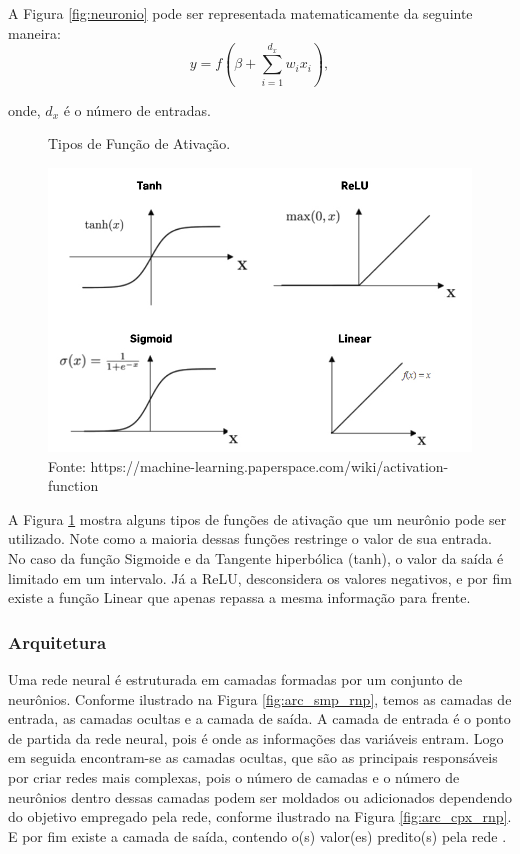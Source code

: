A Figura \ref{fig:neuronio} pode ser representada matematicamente da seguinte maneira:
\begin{equation}
    y = f (\beta + \sum_{i=1}^{d_x} w_ix_{i} ) ,
    \label{neuronio}
\end{equation}
 
\noindent onde, $d_x$ é o número de entradas.


\begin{figure}[H]
    \centering
    \caption{Tipos de Função de Ativação.}
    \includegraphics[scale=0.4]{imagens/activation-functions3.jpg}
    \caption*{Fonte: https://machine-learning.paperspace.com/wiki/activation-function}
    \label{fig:func_ativac}
    
\end{figure}

A Figura \ref{fig:func_ativac} mostra alguns tipos de funções de ativação que um neurônio pode ser utilizado.
Note como a maioria dessas funções restringe o valor de sua entrada. No caso 
da função Sigmoide e da Tangente hiperbólica (tanh), o valor da saída é limitado em um intervalo. Já a ReLU,
 desconsidera os valores negativos, e por fim existe a função Linear que apenas repassa a mesma informação para
 frente.

\vspace{1cm}

\subsubsection{Arquitetura}

Uma rede neural é estruturada em camadas formadas por um conjunto de neurônios. Conforme ilustrado
 na Figura \ref{fig:arc_smp_rnp}, temos as camadas de entrada, as camadas ocultas e a camada de saída. 
 A camada de entrada é o ponto de partida da rede neural, pois é onde as informações das variáveis entram. 
 Logo em seguida encontram-se as camadas ocultas, que são as principais responsáveis por criar redes mais complexas,
  pois o número de camadas e o número de neurônios dentro dessas camadas podem ser moldados ou adicionados dependendo 
  do objetivo empregado pela rede, conforme ilustrado na Figura \ref{fig:arc_cpx_rnp}. E por fim existe a camada de 
  saída, contendo o(s) valor(es) predito(s) pela rede \cite{zell_1994}.

